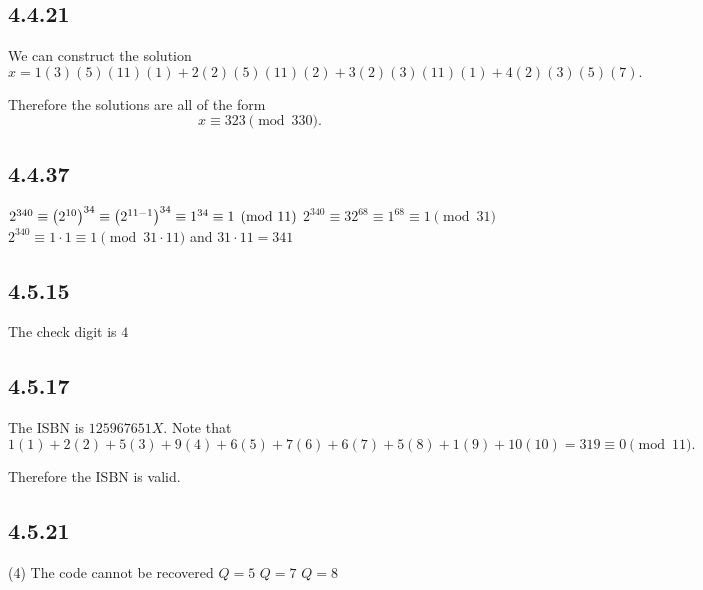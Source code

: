 \documentclass[12pt,titlepage]{extarticle}
\begin{document}
\subsection*{4.4.21}
We can construct the solution
\[
    x = 1(3)(5)(11)(1) + 2(2)(5)(11)(2) + 3(2)(3)(11)(1) + 4(2)(3)(5)(7)
.\]

Therefore the solutions are all of the form
\[
    x \equiv 323 \pmod{330}
.\]

\subsection*{4.4.37}
\begin{tasks}
    \task $2^{340} \equiv \qty(2^{10})^{34} \equiv \qty(2^{11 - 1})^{34} \equiv 1^{34} \equiv 1 \pmod{11}$
    \task $2^{340} \equiv 32^{68} \equiv 1^68 \equiv 1 \pmod{31}$
    \task $2^{340} \equiv 1 \cdot 1 \equiv 1 \pmod{31 \cdot 11}$ and $31 \cdot 11 = 341$
\end{tasks}

\subsection*{4.5.15}
The check digit is $4$

\subsection*{4.5.17}
The ISBN is $125967651X$. Note that
\[
    1(1) + 2(2) + 5(3) + 9(4) + 6(5) + 7(6) + 6(7) + 5(8) + 1(9) + 10(10) = 319 \equiv 0 \pmod{11}
.\]

Therefore the ISBN is valid.

\subsection*{4.5.21}
\begin{tasks}(4)
    \task The code cannot be recovered
    \task $Q = 5$
    \task $Q = 7$
    \task $Q = 8$
\end{tasks}
\end{document}
